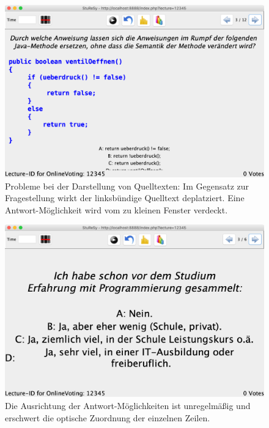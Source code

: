 \begin{figure}[H]
    \includegraphics[width=12cm]{chapter/bewertung/bilder/StuReSy_Problem_2.png}
    \centering
    \caption{Probleme bei der Darstellung von Quelltexten: Im Gegensatz zur Fragestellung wirkt der linksbündige Quelltext deplatziert. Eine Antwort-Möglichkeit wird vom zu kleinen Fenster verdeckt.}
    \label{Abbildung 2.2}
\end{figure}

\begin{figure}[H]
    \includegraphics[width=12cm]{chapter/bewertung/bilder/StuReSy_Problem_1.png}
    \centering
    \caption{Die Ausrichtung der Antwort-Möglichkeiten ist unregelmäßig und erschwert die optische Zuordnung der einzelnen Zeilen.}
    \label{Abbildung 2.3}
\end{figure}
